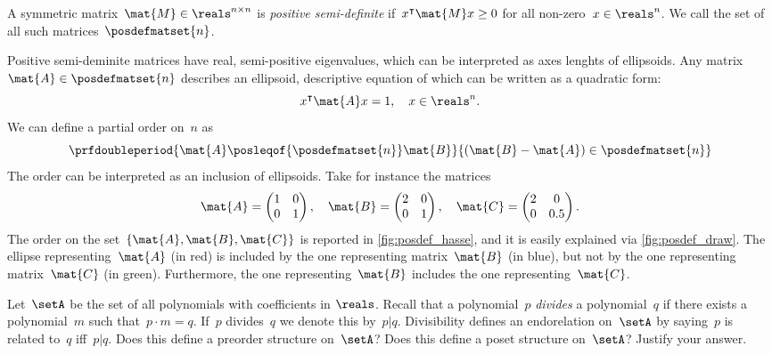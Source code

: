 \begin{example}
	\begin{definition}
		A symmetric matrix~$\mat{M}\in \reals^{n\times n}$ is \emph{positive semi-definite} if~$x^\intercal \mat{M}x\geq 0$ for all non-zero~$x\in \reals^n$.
		We call the set of all such matrices~$\posdefmatset{n}$.
	\end{definition}
	Positive semi-deminite matrices have real, semi-positive eigenvalues, which can be interpreted as axes lenghts of ellipsoids.
	Any matrix~$\mat{A}\in \posdefmatset{n}$ describes an ellipsoid, descriptive equation of which can be written as a quadratic form:
	\begin{equation*}
		x^\intercal \mat{A}x=1,\quad x\in \reals^n.
	\end{equation*}
	We can define a partial order on~$n$ as
	\begin{equation*}
		\prfdoubleperiod{
			\mat{A}\posleqof{\posdefmatset{n}} \mat{B}
		}{
			(\mat{B}-\mat{A})\in \posdefmatset{n}
		}
	\end{equation*}
	The order can be interpreted as an inclusion of ellipsoids.
	Take for instance the matrices
	\begin{equation*}
		\mat{A}=
		\begin{pmatrix}
			1 & 0 \\0& 1
		\end{pmatrix}, \quad \mat{B}=
		\begin{pmatrix}
			2 & 0 \\0& 1
		\end{pmatrix},\quad \mat{C}=
		\begin{pmatrix}
			2 & 0 \\0& 0.5
		\end{pmatrix}.
	\end{equation*}
	The order on the set~$\{\mat{A},\mat{B},\mat{C}\}$ is reported in \cref{fig:posdef_hasse}, and it is easily explained via \cref{fig:posdef_draw}.
	The ellipse representing~$\mat{A}$ (in red) is included by the one representing matrix~$\mat{B}$ (in blue), but not by the one representing matrix~$\mat{C}$ (in green).
	Furthermore, the one representing~$\mat{B}$ includes the one representing~$\mat{C}$.
\end{example}

\vfill
%

\begin{gradedexercise}
	\label{ex:PolynomialDivisibility}
	Let~$\setA$ be the set of all polynomials with coefficients in $\reals$.
	Recall that a polynomial~$p$ \emph{divides} a polynomial~$q$ if there exists a polynomial~$m$ such that~$p \cdot m = q$.
	If~$p$ divides~$q$ we denote this by~$p \vert q$.
	Divisibility defines an endorelation on~$\setA$ by saying~$p$ is related to~$q$ iff~$p \vert q$.
	Does this define a preorder structure on~$\setA$?
	Does this define a poset structure on~$\setA$?
	Justify your answer.
\end{gradedexercise}

